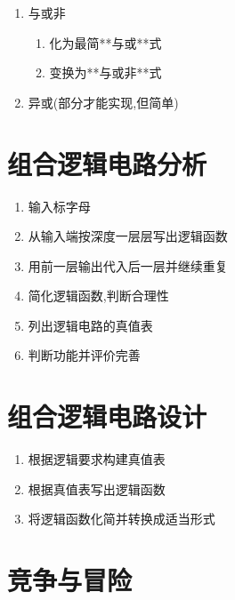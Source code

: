\begin{enumerate}
\begin{enumerate}
\begin{enumerate}
          \end{enumerate}


    \item 与或非

          \begin{enumerate}

              \item 化为最简**与或**式
              \item 变换为**与或非**式

          \end{enumerate}

    \item 异或(部分才能实现,但简单)

\end{enumerate}

\newpage

\section{组合逻辑电路分析}

\begin{enumerate}

    \item 输入标字母
    \item 从输入端按深度一层层写出逻辑函数
    \item 用前一层输出代入后一层并继续重复
    \item 简化逻辑函数,判断合理性
    \item 列出逻辑电路的真值表
    \item 判断功能并评价完善

\end{enumerate}

\section{组合逻辑电路设计}

\begin{enumerate}

    \item 根据逻辑要求构建真值表
    \item 根据真值表写出逻辑函数
    \item 将逻辑函数化简并转换成适当形式

\end{enumerate}

\newpage

\section{竞争与冒险}


\end{enumerate}
